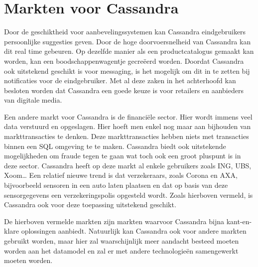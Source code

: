 \section{Markten voor Cassandra}
Door de geschiktheid voor aanbevelingssystemen kan Cassandra eindgebruikers persoonlijke suggesties geven.
Door de hoge doorvoersnelheid van Cassandra kan dit real time gebeuren.
Op dezelfde manier als een productcatalogus gemaakt kan worden, kan een boodschappenwagentje gecreëerd worden.
Doordat Cassandra ook uitstekend geschikt is voor messaging, is het mogelijk om dit in te zetten bij notificaties voor de eindgebruiker.
Met al deze zaken in het achterhoofd kan besloten worden dat Cassandra een goede keuze is voor retailers en aanbieders van digitale media.

Een andere markt voor Cassandra is de financiële sector.
Hier wordt immens veel data verstuurd en opgeslagen.
Hier hoeft men enkel nog maar aan bijhouden van markttransacties te denken.
Deze markttransacties hebben niets met transacties binnen een SQL omgeving te te maken.
Cassandra biedt ook uitstekende mogelijkheden om fraude tegen te gaan wat toch ook een groot pluspunt is in deze sector.
Cassandra heeft op deze markt al enkele gebruikers zoals ING, UBS, Xoom\dots
Een relatief nieuwe trend is dat verzekeraars, zoals Corona en AXA, bijvoorbeeld sensoren in een auto laten plaatsen en dat op basis van deze sensorgegevens een verzekeringspolis opgesteld wordt.
Zoals hierboven vermeld, is Cassandra ook voor deze toepassing uitstekend geschikt.

De hierboven vermelde markten zijn markten waarvoor Cassandra bijna kant-en-klare oplossingen aanbiedt.
Natuurlijk kan Cassandra ook voor andere markten gebruikt worden, maar hier zal waarschijnlijk meer aandacht besteed moeten worden aan het datamodel en zal er met andere technologieën samengewerkt moeten worden.